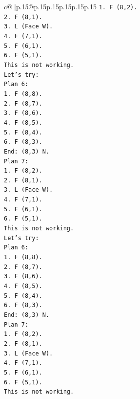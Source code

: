 \documentclass{article}
\begin{document}
{\begin{supertabular}{c@{$\;$}|p{.15\linewidth}@{}p{.15\linewidth}p{.15\linewidth}p{.15\linewidth}p{.15\linewidth}p{.15\linewidth}}
{{{\texttt{1. F (8,2).} \\
\texttt{2. F (8,1).} \\
\texttt{3. L (Face W).} \\
\texttt{4. F (7,1).} \\
\texttt{5. F (6,1).} \\
\texttt{6. F (5,1).} \\
\texttt{This is not working.} \\
\texttt{Let's try:} \\
\texttt{Plan 6:} \\
\texttt{1. F (8,8).} \\
\texttt{2. F (8,7).} \\
\texttt{3. F (8,6).} \\
\texttt{4. F (8,5).} \\
\texttt{5. F (8,4).} \\
\texttt{6. F (8,3).} \\
\texttt{End: (8,3) N.} \\
\texttt{Plan 7:} \\
\texttt{1. F (8,2).} \\
\texttt{2. F (8,1).} \\
\texttt{3. L (Face W).} \\
\texttt{4. F (7,1).} \\
\texttt{5. F (6,1).} \\
\texttt{6. F (5,1).} \\
\texttt{This is not working.} \\
\texttt{Let's try:} \\
\texttt{Plan 6:} \\
\texttt{1. F (8,8).} \\
\texttt{2. F (8,7).} \\
\texttt{3. F (8,6).} \\
\texttt{4. F (8,5).} \\
\texttt{5. F (8,4).} \\
\texttt{6. F (8,3).} \\
\texttt{End: (8,3) N.} \\
\texttt{Plan 7:} \\
\texttt{1. F (8,2).} \\
\texttt{2. F (8,1).} \\
\texttt{3. L (Face W).} \\
\texttt{4. F (7,1).} \\
\texttt{5. F (6,1).} \\
\texttt{6. F (5,1).} \\
\texttt{This is not working.} \\
}}}
\end{supertabular}}
\end{document}
